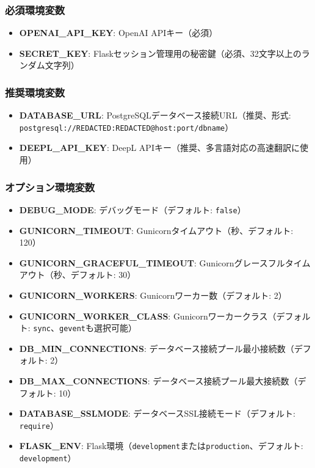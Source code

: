 \documentclass[a4paper,11pt,ja=standard,xelatex]{bxjsarticle}
\theoremstyle{definition}
\begin{document}
\subsubsection{必須環境変数}

\begin{itemize}
\item \textbf{OPENAI\_API\_KEY}: OpenAI APIキー（必須）
\item \textbf{SECRET\_KEY}: Flaskセッション管理用の秘密鍵（必須、32文字以上のランダム文字列）
\end{itemize}

\subsubsection{推奨環境変数}

\begin{itemize}
\item \textbf{DATABASE\_URL}: PostgreSQLデータベース接続URL（推奨、形式: \texttt{postgresql://REDACTED:REDACTED@host:port/dbname}）
\item \textbf{DEEPL\_API\_KEY}: DeepL APIキー（推奨、多言語対応の高速翻訳に使用）
\end{itemize}

\subsubsection{オプション環境変数}

\begin{itemize}
\item \textbf{DEBUG\_MODE}: デバッグモード（デフォルト: \texttt{false}）
\item \textbf{GUNICORN\_TIMEOUT}: Gunicornタイムアウト（秒、デフォルト: 120）
\item \textbf{GUNICORN\_GRACEFUL\_TIMEOUT}: Gunicornグレースフルタイムアウト（秒、デフォルト: 30）
\item \textbf{GUNICORN\_WORKERS}: Gunicornワーカー数（デフォルト: 2）
\item \textbf{GUNICORN\_WORKER\_CLASS}: Gunicornワーカークラス（デフォルト: \texttt{sync}、\texttt{gevent}も選択可能）
\item \textbf{DB\_MIN\_CONNECTIONS}: データベース接続プール最小接続数（デフォルト: 2）
\item \textbf{DB\_MAX\_CONNECTIONS}: データベース接続プール最大接続数（デフォルト: 10）
\item \textbf{DATABASE\_SSLMODE}: データベースSSL接続モード（デフォルト: \texttt{require}）
\item \textbf{FLASK\_ENV}: Flask環境（\texttt{development}または\texttt{production}、デフォルト: \texttt{development}）
\end{itemize}
\end{document}
